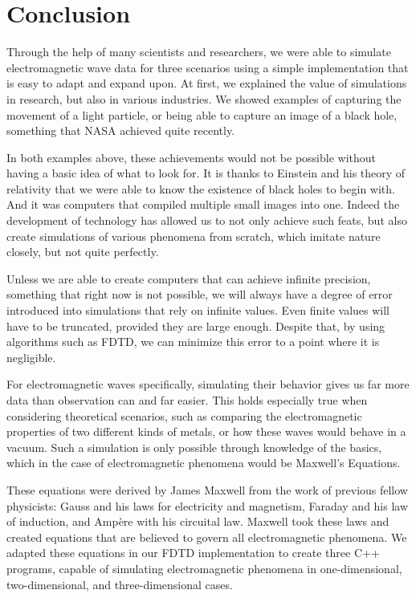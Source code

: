 
\chapter{Conclusion} %

\label{Chapter5} %

Through the help of many scientists and researchers, we were able to simulate electromagnetic wave data for three scenarios using a simple implementation that is easy to adapt and expand upon. At first, we explained the value of simulations in research, but also in various industries. We showed examples of capturing the movement of a light particle\textsuperscript{\cite{velten2013femto}}, or being able to capture an image of a black hole\textsuperscript{\cite{landau_2019}}, something that NASA achieved quite recently.

In both examples above, these achievements would not be possible without having a basic idea of what to look for. It is thanks to Einstein and his theory of relativity that we were able to know the existence of black holes to begin with\textsuperscript{\cite{Eling_2010}}. And it was computers that compiled multiple small images into one. Indeed the development of technology has allowed us to not only achieve such feats, but also create simulations of various phenomena from scratch, which imitate nature closely, but not quite perfectly.

Unless we are able to create computers that can achieve infinite precision, something that right now is not possible, we will always have a degree of error introduced into simulations that rely on infinite values. Even finite values will have to be truncated, provided they are large enough. Despite that, by using algorithms such as FDTD, we can minimize this error to a point where it is negligible. 

For electromagnetic waves specifically, simulating their behavior gives us far more data than observation can and far easier. This holds especially true when considering theoretical scenarios, such as comparing the electromagnetic properties of two different kinds of metals, or how these waves would behave in a vacuum. Such a simulation is only possible through knowledge of the basics, which in the case of electromagnetic phenomena would be Maxwell's Equations.

These equations were derived by James Maxwell from the work of previous fellow physicists: Gauss and his laws for electricity and magnetism, Faraday and his law of induction, and Ampère with his circuital law. Maxwell took these laws and created equations that are believed to govern all electromagnetic phenomena. We adapted these equations in our FDTD implementation to create three C++ programs, capable of simulating electromagnetic phenomena in one-dimensional, two-dimensional, and three-dimensional cases.

